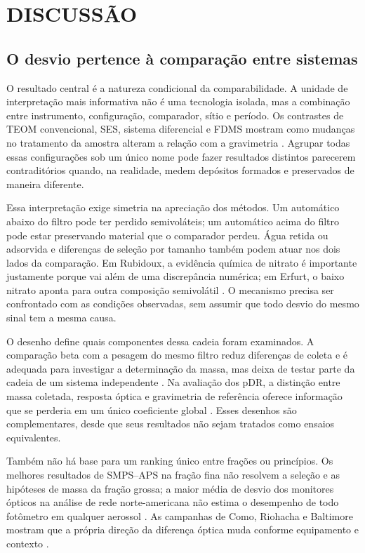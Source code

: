 \section{DISCUSSÃO}
\subsection{O desvio pertence à comparação entre sistemas}

O resultado central é a natureza condicional da comparabilidade. A unidade de interpretação mais informativa não é uma tecnologia isolada, mas a combinação entre instrumento, configuração, comparador, sítio e período. Os contrastes de TEOM convencional, SES, sistema diferencial e FDMS mostram como mudanças no tratamento da amostra alteram a relação com a gravimetria \parencite{rsl201,rsl144,rsl101,rsl105}. Agrupar todas essas configurações sob um único nome pode fazer resultados distintos parecerem contraditórios quando, na realidade, medem depósitos formados e preservados de maneira diferente.

Essa interpretação exige simetria na apreciação dos métodos. Um automático abaixo do filtro pode ter perdido semivoláteis; um automático acima do filtro pode estar preservando material que o comparador perdeu. Água retida ou adsorvida e diferenças de seleção por tamanho também podem atuar nos dois lados da comparação. Em Rubidoux, a evidência química de nitrato é importante justamente porque vai além de uma discrepância numérica; em Erfurt, o baixo nitrato aponta para outra composição semivolátil \parencite{rsl101,rsl201}. O mecanismo precisa ser confrontado com as condições observadas, sem assumir que todo desvio do mesmo sinal tem a mesma causa.

O desenho define quais componentes dessa cadeia foram examinados. A comparação beta com a pesagem do mesmo filtro reduz diferenças de coleta e é adequada para investigar a determinação da massa, mas deixa de testar parte da cadeia de um sistema independente \parencite{rsl214}. Na avaliação dos pDR, a distinção entre massa coletada, resposta óptica e gravimetria de referência oferece informação que se perderia em um único coeficiente global \parencite{rsl089}. Esses desenhos são complementares, desde que seus resultados não sejam tratados como ensaios equivalentes.

Também não há base para um ranking único entre frações ou princípios. Os melhores resultados de SMPS--APS na fração fina não resolvem a seleção e as hipóteses de massa da fração grossa; a maior média de desvio dos monitores ópticos na análise de rede norte-americana não estima o desempenho de todo fotômetro em qualquer aerossol \parencite{rsl288,rsl283,rsl026}. As campanhas de Como, Riohacha e Baltimore mostram que a própria direção da diferença óptica muda conforme equipamento e contexto \parencite{rsl388,rsl226,rsl368}.

